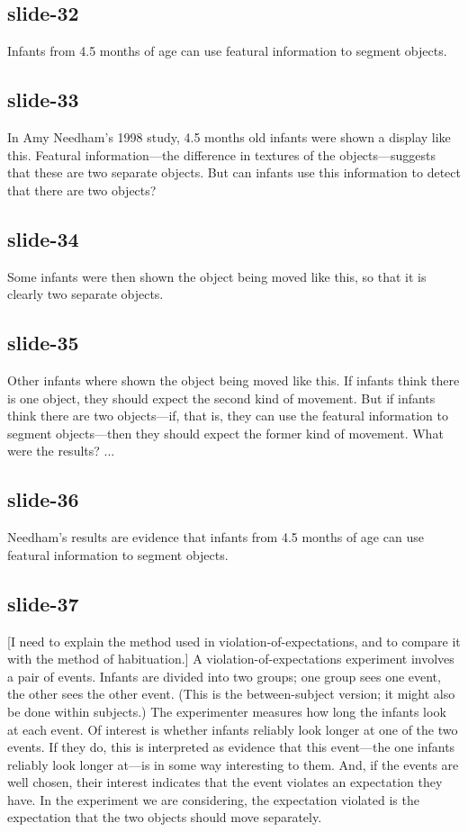 \documentclass[12pt,\papersize]{extarticle}
\begin{document}
\subsection{slide-32}
Infants from 4.5 months of age can use featural information to segment objects.
 
\subsection{slide-33}
In Amy Needham's 1998 study, 4.5 months old infants were shown a display like this.
Featural information---the difference in textures of the objects---suggests that these are two 
separate objects.  But can infants use this information to detect that there are two objects?
 
\subsection{slide-34}
Some infants were then shown the object being moved like this, so that it is clearly two 
separate objects.
 
\subsection{slide-35}
Other infants where shown the object being moved like this.
If infants think there is one object, they should expect the second kind of movement.
But if infants think there are two objects---if, that is, they can use the featural 
information to segment objects---then they should expect the former kind of movement.
What were the results?  ...
 
\subsection{slide-36}
Needham's results are evidence that infants from 4.5 months of age can use featural information 
to segment objects.
 
\subsection{slide-37}
[I need to explain the method used in violation-of-expectations, and to compare it with
the method of habituation.]
A violation-of-expectations experiment involves a pair of events.
Infants are divided into two groups; one group sees one event, the other sees the other event.
(This is the between-subject version; it might also be done within subjects.)
The experimenter measures how long the infants look at each event.
Of interest is whether infants reliably look longer at one of the two events.
If they do, this is interpreted as evidence that this event---the one infants reliably look 
longer at---is in some way interesting to them. 
And, if the events are well chosen, their interest indicates that the event violates an
expectation they have.
In the experiment we are considering, the expectation violated is the expectation that 
the two objects should move separately.
 
\end{document}
